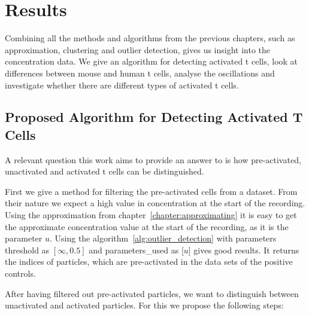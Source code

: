 \chapter{Results}
\label{chapter:results}

Combining all the methods and algorithms from the previous chapters, such as approximation, clustering and outlier detection, gives us insight into the \Calcium concentration data. We give an algorithm for detecting activated t cells, look at differences between mouse and human t cells, analyse the oscillations and investigate whether there are different types of activated t cells.

\section{Proposed Algorithm for Detecting Activated T Cells}
\label{sec:proposed-algorithm}

A relevant question this work aims to provide an answer to is how pre-activated, unactivated and activated t cells can be distinguished.

First we give a method for filtering the pre-activated cells from a dataset. From their nature we expect a high value in \Calcium concentration at the start of the recording. Using the approximation from chapter~\ref{chapter:approximating} it is easy to get the approximate \Calcium concentration value at the start of the recording, as it is the parameter $u$. Using the algorithm~\ref{alg:outlier_detection} with parameters threshold as $[\infty, 0.5]$ and parameters\_used as [$u$] gives good results. It returns the indices of particles, which are pre-activated in the data sets of the positive controls.

After having filtered out pre-activated particles, we want to distinguish between unactivated and activated particles. For this we propose the following steps:

